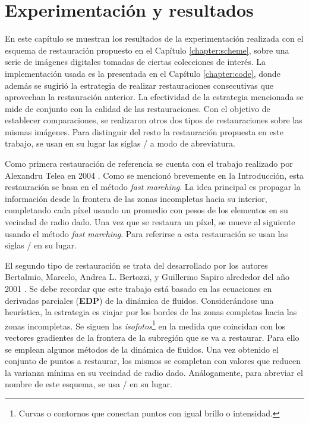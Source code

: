 \chapter{Experimentaci\'on y resultados}\label{chapter:results}
En este cap\'itulo se muestran los resultados de la experimentaci\'on realizada con el esquema de restauraci\'on propuesto en el Cap\'itulo \ref{chapter:scheme}, sobre una serie de im\'agenes digitales tomadas de ciertas colecciones de inter\'es. La implementaci\'on usada es la presentada en el Cap\'itulo \ref{chapter:code}, donde adem\'as se sugiri\'o la estrategia de realizar restauraciones consecutivas que aprovechan la restauraci\'on anterior. La efectividad de la estrategia mencionada se mide de conjunto con la calidad de las restauraciones. Con el objetivo de establecer comparaciones, se realizaron otros dos tipos de restauraciones sobre las mismas im\'agenes. Para distinguir del resto la restauraci\'on propuesta en este trabajo, se usan en su lugar las siglas \SOP/ a modo de abreviatura.

Como primera restauraci\'on de referencia se cuenta con el trabajo realizado por Alexandru Telea en 2004 \cite{telea2004image}. Como se mencion\'o brevemente en la Introducci\'on, esta restauraci\'on se basa en el m\'etodo \textit{fast marching}. La idea principal es propagar la informaci\'on desde la frontera de las zonas incompletas hacia su interior, completando cada p\'ixel usando un promedio con pesos de los elementos en su vecindad de radio dado. Una vez que se restaura un p\'ixel, se mueve al siguiente usando el m\'etodo \textit{fast marching}. Para referirse a esta restauraci\'on se usan las siglas \TELEA/ en su lugar.

El segundo tipo de restauraci\'on se trata del desarrollado por los autores Bertalmio, Marcelo, Andrea L. Bertozzi, y Guillermo Sapiro alrededor del año 2001 \cite{bertalmio2001navier}. Se debe recordar que este trabajo est\'a basado en las ecuaciones en derivadas parciales (\textbf{EDP}) de la din\'amica de fluidos. Considerándose una heur\'istica, la estrategia es viajar por los bordes de las zonas completas hacia las zonas incompletas. Se siguen las \textit{isofotos}\footnote{Curvas o contornos que conectan puntos con igual brillo o intensidad.} en la medida que coincidan con los vectores gradientes de la frontera de la subregi\'on que se va a restaurar. Para ello se emplean algunos m\'etodos de la din\'amica de fluidos. Una vez obtenido el conjunto de puntos a restaurar, los mismos se completan con valores que reducen la varianza m\'inima en su vecindad de radio dado. An\'alogamente, para abreviar el nombre de este esquema, se usa \NS/ en su lugar.

